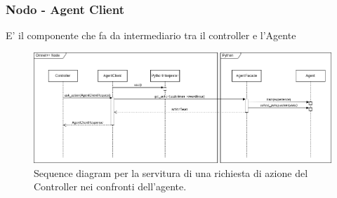 \documentclass[compress]{beamer}
\begin{document}
\subsubsection*{Nodo - Agent Client}
\begin{frame}{\subsubsecname}
    E' il componente che fa da intermediario tra il controller e l'Agente

    \begin{figure}
        \centering
        \includegraphics[width=\textwidth]{figs/agentc_sequence_diagram.drawio.png}
        \caption{Sequence diagram per la servitura di una richiesta di azione del Controller nei confronti dell'agente.}
        \label{fig:agentc_sequence_diagram}
    \end{figure}
\end{frame}
\end{document}
